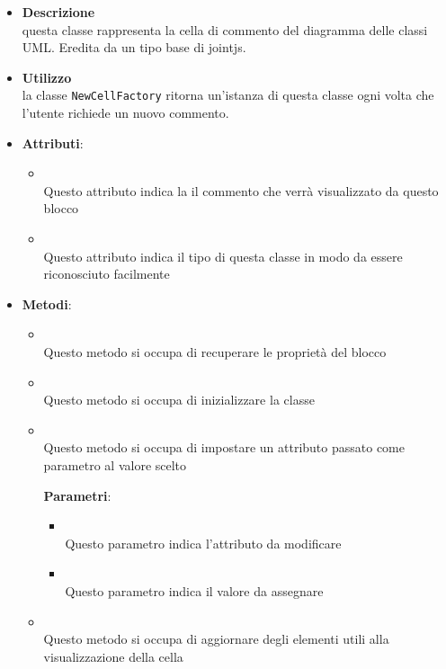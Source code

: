 \label{\nogloxy{swedesigner::client::model::celltypes::class::HxComment}}
\begin{figure}[h]
\centering
{}
\caption{}
\end{figure}
\FloatBarrier
\begin{itemize}
\item \textbf{Descrizione}\\
questa classe rappresenta la cella di commento del diagramma delle classi UML. Eredita da un tipo base di jointjs.
\item \textbf{Utilizzo}\\
la classe \texttt{NewCellFactory} ritorna un'istanza di questa classe ogni volta che l'utente richiede un nuovo commento.
\item \textbf{Attributi}:
\begin{itemize}
\item {}
\\ Questo attributo indica la il commento che verrà visualizzato da questo blocco
\item {}
\\ Questo attributo indica il tipo di questa classe in modo da essere riconosciuto facilmente
\end{itemize}
\item \textbf{Metodi}:
\begin{itemize}
\item {}
\\ Questo metodo si occupa di recuperare le proprietà del blocco
\item {}
\\ Questo metodo si occupa di inizializzare la classe

\item {}
\\ Questo metodo si occupa di impostare un attributo passato come parametro al valore scelto

\textbf{Parametri}:
\begin{itemize}
\item {}
\\ Questo parametro indica l'attributo da modificare

\item {}
\\ Questo parametro indica il valore da assegnare

\end{itemize}
\item {}
\\ Questo metodo si occupa di aggiornare degli elementi utili alla visualizzazione della cella

\end{itemize}
\end{itemize}

